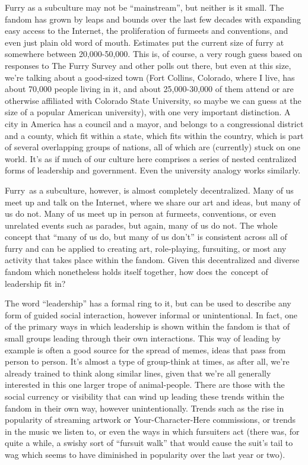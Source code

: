 Furry as a subculture may not be ``mainstream'', but neither is it
small. The fandom has grown by leaps and bounds over the last few
decades with expanding easy access to the Internet, the proliferation of
furmeets and conventions, and even just plain old word of mouth.
Estimates put the current size of furry at somewhere between
20,000-50,000. This is, of course, a very rough guess based on responses
to The Furry Survey and other polls out there, but even at this size,
we're talking about a good-sized town (Fort Collins, Colorado, where I
live, has about 70,000 people living in it, and about 25,000-30,000 of
them attend or are otherwise affiliated with Colorado State University,
so maybe we can guess at the size of a popular American university),
with one very important distinction. A city in America has a council and
a mayor, and belongs to a congressional district and a county, which fit
within a state, which fits within the country, which is part of several
overlapping groups of nations, all of which are (currently) stuck on one
world. It's as if much of our culture here comprises a series of nested
centralized forms of leadership and government. Even the university
analogy works similarly.

Furry~as a subculture, however, is almost completely decentralized. Many
of us meet up and talk on the Internet, where we share our art and
ideas, but many of us do not. Many of us meet up in person at furmeets,
conventions, or even unrelated events such as parades, but again, many
of us do not. The whole concept that ``many of us do, but many of us
don't'' is consistent across all of furry and can be applied to creating
art, role-playing, fursuiting, or most any activity that takes place
within the fandom. Given this decentralized and diverse fandom which
nonetheless holds itself together, how does the~concept of leadership
fit in?

The word ``leadership'' has a formal ring to it, but can be used to
describe any form of guided social interaction, however informal or
unintentional. In fact, one of the primary ways in which leadership is
shown within the fandom is that of small groups leading through their
own interactions. This way of leading by example is often a good source
for the spread of memes, ideas that pass from person to person. It's
almost a type of group-think at times, as after all, we're already
trained to think along similar lines, given that we're all generally
interested in this one larger trope of animal-people. There are those
with the social currency or visibility that can wind up leading these
trends within the fandom in their own way, however unintentionally.
Trends such as the rise in popularity of streaming artwork or
Your-Character-Here commissions, or trends in the music we listen to, or
even the ways in which fursuiters act (there was, for quite a while, a
swishy sort of ``fursuit walk'' that would cause the suit's tail to wag
which seems to have diminished in popularity over the last year or two).

